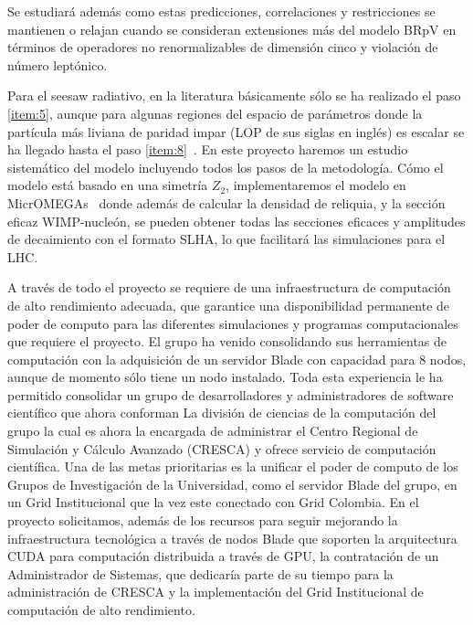 \begin{bbrpvlhc}
   Se estudiará además como estas predicciones, correlaciones y
   restricciones se mantienen o relajan cuando se consideran
   extensiones más del modelo BRpV en términos de operadores no
   renormalizables de dimensión cinco y violación de número leptónico.  
\end{bbrpvlhc}

\begin{darkmatter}
  Para el seesaw radiativo, en la literatura básicamente sólo se ha
  realizado el paso \ref{item:5}, aunque para algunas regiones del
  espacio de parámetros donde la partícula más liviana de paridad
  impar (LOP de sus siglas en inglés) es escalar se ha llegado hasta
  el paso \ref{item:8}~\cite{Bergman:2007pm}. En este proyecto haremos un
  estudio sistemático del modelo incluyendo todos los pasos de la
  metodología. Cómo el modelo está basado en una simetría $Z_2$,
  implementaremos el modelo en MicrOMEGAs~\cite{Belanger:2006is,Belanger:2008sj,Belanger:2010gh} donde
  además de calcular la densidad de reliquia, y la sección eficaz
  WIMP-nucleón, se pueden obtener todas las secciones eficaces y
  amplitudes de decaimiento con el formato SLHA, lo que facilitará las
  simulaciones para el LHC.
\end{darkmatter}




A través de todo el proyecto se requiere de una infraestructura de
computación de alto rendimiento adecuada, que garantice una
disponibilidad permanente de poder de computo para las diferentes
simulaciones y programas computacionales que requiere el proyecto. El
grupo ha venido consolidando sus herramientas de computación con la
adquisición de un servidor Blade con capacidad para 8 nodos, aunque de
momento sólo tiene un nodo instalado. Toda esta experiencia le ha
permitido consolidar un grupo de desarrolladores y administradores de
software científico que ahora conforman La división de ciencias de la
computación del grupo la cual es ahora la encargada de administrar el
Centro Regional de Simulación y Cálculo Avanzado (CRESCA) y ofrece
servicio de computación científica.  Una de las metas prioritarias es
la unificar el poder de computo de los Grupos de Investigación de la
Universidad, como el servidor Blade del grupo, en un Grid
Institucional que la vez este conectado con Grid Colombia. En el
proyecto solicitamos, además de los recursos para seguir mejorando la
infraestructura tecnológica a través de nodos Blade que soporten la
arquitectura CUDA para computación distribuida a través de GPU, la
contratación de un Administrador de Sistemas, que dedicaría parte de
su tiempo para la administración de CRESCA y la implementación del
Grid Institucional de computación de alto rendimiento.



